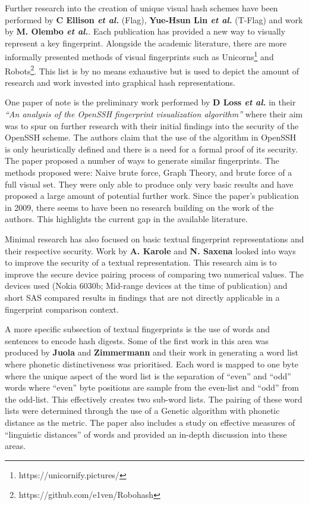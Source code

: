 Further research into the creation of unique visual hash schemes have been performed by \textbf{C Ellison \textit{et al.}} \cite{ellison2003public} (Flag), \textbf{Yue-Hsun Lin \textit{et al.}}\cite{lin2010spate} (T-Flag) and work by \textbf{M.  Olembo \textit{et al.}}\cite{olembo2013developing}. Each publication has provided a new way to visually represent a key fingerprint. Alongside the academic literature, there are more informally presented methods of visual fingerprints such as Unicorns\footnote{https://unicornify.pictures/} and Robots\footnote{https://github.com/e1ven/Robohash}. This list is by no means exhaustive but is used to depict the amount of research and work invested into graphical hash representations.

One paper of note is the preliminary work performed by \textbf{D Loss \textit{et al.}}\cite{loss2009drunken} in their \textit{``An analysis of the OpenSSH fingerprint visualization algorithm''} where their aim was to spur on further research with their initial findings into the security of the OpenSSH scheme. The authors claim that the use of the algorithm in OpenSSH is only heuristically defined and there is a need for a formal proof of its security. \\
The paper proposed a number of ways to generate similar fingerprints. The methods proposed were: Naive brute force, Graph Theory, and brute force of a full visual set. They were only able to produce only very basic results and have proposed a large amount of potential further work. Since the paper's publication in 2009, there seems to have been no research building on the work of the authors. This highlights the current gap in the available literature.

Minimal research has also focused on basic textual fingerprint representations and their respective security. Work by \textbf{A. Karole} and \textbf{N. Saxena}\cite{karole2009improving} looked into ways to improve the security of a textual representation. This research aim is to improve the secure device pairing process of comparing two numerical values. The devices used (Nokia 6030b; Mid-range devices at the time of publication) and short SAS compared results in findings that are not directly applicable in a fingerprint comparison context. 

A more specific subsection of textual fingerprints is the use of words and sentences to encode hash digests. Some of the first work in this area was produced by \textbf{Juola} and \textbf{Zimmermann}
\cite{juola1996whole} and their work in generating a word list where phonetic distinctiveness was prioritised. Each word is mapped to one byte where the unique aspect of the word list is the separation of ``even'' and ``odd'' words where ``even'' byte positions are sample from the even-list and ``odd'' from the odd-list. This effectively creates two sub-word lists. The pairing of these word lists were determined through the use of a Genetic algorithm with phonetic distance as the metric. The paper also includes a study on effective measures of ``linguistic distances'' of words and provided an in-depth discussion into these areas.

